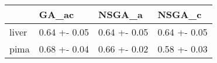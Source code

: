 \begin{tabular}{llll}
\toprule
{} &         GA\_ac &        NSGA\_a &        NSGA\_c \\
\midrule
liver &  0.64 +- 0.05 &  0.64 +- 0.05 &  0.64 +- 0.05 \\
pima  &  0.68 +- 0.04 &  0.66 +- 0.02 &  0.58 +- 0.03 \\
\bottomrule
\end{tabular}
